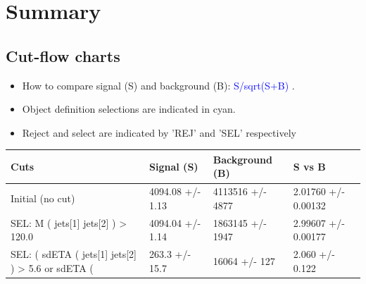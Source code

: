 \documentclass[a4paper, 10pt]{article}
\begin{document}
\newpage
\section{ Summary}

\subsection{Cut-flow charts}

\begin{itemize}
  \item How to compare signal (S) and background (B): \textcolor{blue}{S/\-sqrt(S+B)} .
   \item Object definition selections are indicated in cyan.  \item Reject and select are indicated by 'REJ' and 'SEL' respectively
\end{itemize}
\begin{table}[H]
  \begin{center}
    \begin{tabular}{|m{36.0mm}|m{36.0mm}|m{36.0mm}|m{33.0mm}|}
      \hline
      {\cellcolor{yellow}        Cuts}& {\cellcolor{yellow}         Signal (S)}& {\cellcolor{yellow}         Background (B)}& {\cellcolor{yellow}         S vs B}\\
      \hline
      {\cellcolor{white}         Initial (no cut)}& {\cellcolor{white}         4094.08 +/\-- 1.13}& {\cellcolor{white}         4113516 +/\-- 4877}& {\cellcolor{white}         2.01760 +/\-- 0.00132}\\
      \hline
      {\cellcolor{white} SEL: M ( jets[1] jets[2] ) > 120.0}& {\cellcolor{white}         4094.04 +/\-- 1.14}& {\cellcolor{white}         1863145 +/\-- 1947}& {\cellcolor{white}         2.99607 +/\-- 0.00177}\\
      \hline
      {\cellcolor{white} SEL: ( sdETA ( jets[1] jets[2] ) > 5.6 or sdETA ( }& {\cellcolor{white}         263.3 +/\-- 15.7}& {\cellcolor{white}         16064 +/\-- 127}& {\cellcolor{white}         2.060 +/\-- 0.122}\\
\hline
    \end{tabular}
  \end{center}
\end{table}
\end{document}
